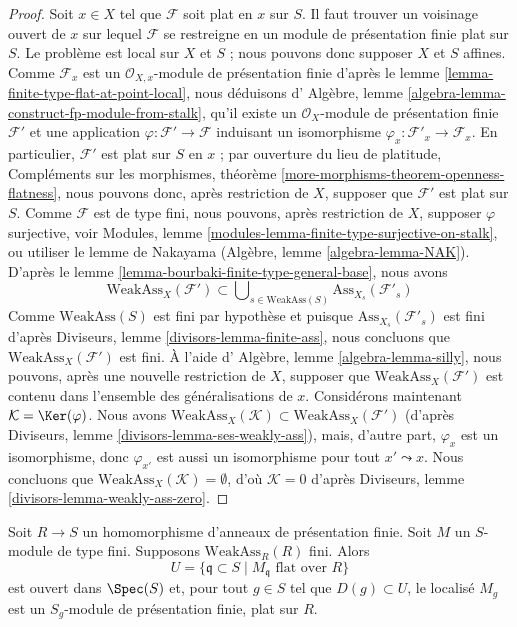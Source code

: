 \begin{proof}
Soit $x \in X$ tel que $\mathcal{F}$ soit plat en $x$ sur $S$.
Il faut trouver un voisinage ouvert de $x$ sur lequel $\mathcal{F}$ se restreigne
en un module de présentation finie plat sur $S$.
Le problème est local sur $X$ et $S$ ; nous pouvons donc supposer $X$ et $S$
affines. Comme $\mathcal{F}_x$ est un
$\mathcal{O}_{X, x}$-module de présentation finie d'après le
lemme \ref{lemma-finite-type-flat-at-point-local},
nous déduisons d'
Algèbre, lemme \ref{algebra-lemma-construct-fp-module-from-stalk},
qu'il existe un $\mathcal{O}_X$-module de présentation finie $\mathcal{F}'$
et une application $\varphi : \mathcal{F}' \to \mathcal{F}$ induisant
un isomorphisme $\varphi_x : \mathcal{F}'_x \to \mathcal{F}_x$. En particulier,
$\mathcal{F}'$ est plat sur $S$ en $x$ ; par ouverture
du lieu de platitude,
Compléments sur les morphismes, théorème \ref{more-morphisms-theorem-openness-flatness},
nous pouvons donc, après restriction de $X$, supposer que
$\mathcal{F}'$ est plat sur $S$. Comme $\mathcal{F}$ est de type fini,
nous pouvons, après restriction de $X$, supposer $\varphi$ surjective, voir
Modules, lemme \ref{modules-lemma-finite-type-surjective-on-stalk},
ou utiliser le lemme de Nakayama
(Algèbre, lemme \ref{algebra-lemma-NAK}).
D'après le
lemme \ref{lemma-bourbaki-finite-type-general-base},
nous avons
$$
\text{WeakAss}_X(\mathcal{F}') \subset
\bigcup\nolimits_{s \in \text{WeakAss}(S)} \text{Ass}_{X_s}(\mathcal{F}'_s)
$$
Comme $\text{WeakAss}(S)$ est fini par hypothèse et puisque
$\text{Ass}_{X_s}(\mathcal{F}'_s)$ est fini d'après
Diviseurs, lemme \ref{divisors-lemma-finite-ass},
nous concluons que $\text{WeakAss}_X(\mathcal{F}')$ est fini. À l'aide d'
Algèbre, lemme \ref{algebra-lemma-silly},
nous pouvons, après une nouvelle restriction de $X$, supposer que
$\text{WeakAss}_X(\mathcal{F}')$ est contenu dans l'ensemble des généralisations
de $x$. Considérons maintenant $\mathcal{K} = \Ker(\varphi)$. Nous avons
$\text{WeakAss}_X(\mathcal{K}) \subset \text{WeakAss}_X(\mathcal{F}')$
(d'après
Diviseurs, lemme \ref{divisors-lemma-ses-weakly-ass}),
mais, d'autre part, $\varphi_x$ est un isomorphisme, donc $\varphi_{x'}$
est aussi un isomorphisme pour tout $x' \leadsto x$. Nous concluons que
$\text{WeakAss}_X(\mathcal{K}) = \emptyset$, d'où
$\mathcal{K} = 0$ d'après
Diviseurs, lemme \ref{divisors-lemma-weakly-ass-zero}.
\end{proof}

\begin{lemma}
\label{lemma-finite-type-flat-algebra}
Soit $R \to S$ un homomorphisme d'anneaux de présentation finie.
Soit $M$ un $S$-module de type fini. Supposons $\text{WeakAss}_R(R)$ fini.
Alors
$$
U = \{\mathfrak q \subset S \mid M_{\mathfrak q}\text{ flat over }R\}
$$
est ouvert dans $\Spec(S)$ et, pour tout $g \in S$ tel que
$D(g) \subset U$, le localisé $M_g$ est un
$S_g$-module de présentation finie, plat sur $R$.
\end{lemma}


